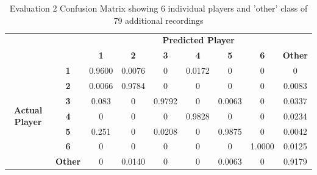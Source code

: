 \documentclass{article}
\begin{document}
{{{\begin{table}[t!]
\begin{centering}
\begin{minipage}{0.4\textwidth}
\begin{tabular}{cc|c|c|c|c|c|c|c|}
\cline{3-9}
\multicolumn{1}{l}{}                                          & \multicolumn{1}{l|}{} & \multicolumn{7}{c|}{\textbf{Predicted Player}}                                               \\ \cline{3-9} 
\multicolumn{1}{l}{}                                          & \multicolumn{1}{l|}{} & \textbf{1} & \textbf{2} & \textbf{3} & \textbf{4} & \textbf{5} & \textbf{6} & \textbf{Other} \\ \hline
\multicolumn{1}{|c|}{\multirow{7}{*}{\begin{turn}{90}\textbf{Actual Player}\end{turn}}} & \textbf{1}            & 0.9600     & 0.0076     & 0          & 0.0172     & 0          & 0          & 0              \\ \cline{2-9} 
\multicolumn{1}{|c|}{}                                        & \textbf{2}            & 0.0066     & 0.9784     & 0          & 0          & 0          & 0          & 0.0083         \\ \cline{2-9} 
\multicolumn{1}{|c|}{}                                        & \textbf{3}            & 0.083      & 0          & 0.9792     & 0          & 0.0063     & 0          & 0.0337         \\ \cline{2-9} 
\multicolumn{1}{|c|}{}                                        & \textbf{4}            & 0          & 0          & 0          & 0.9828     & 0          & 0          & 0.0234         \\ \cline{2-9} 
\multicolumn{1}{|c|}{}                                        & \textbf{5}            & 0.251      & 0          & 0.0208     & 0          & 0.9875     & 0          & 0.0042         \\ \cline{2-9} 
\multicolumn{1}{|c|}{}                                        & \textbf{6}            & 0          & 0          & 0          & 0          & 0          & 1.0000     & 0.0125         \\ \cline{2-9} 
\multicolumn{1}{|c|}{}                                        & \textbf{Other}        & 0          & 0.0140     & 0          & 0          & 0.0063     & 0          & 0.9179         \\ \hline
\end{tabular}%

\caption{Evaluation 2 Confusion Matrix showing 6 individual players and 'other' class of 79 additional recordings}


\end{minipage}
\end{centering}
\end{table}}}}
\end{document}
